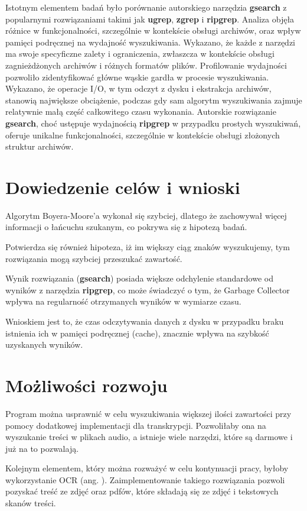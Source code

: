 Istotnym elementem badań było porównanie autorskiego narzędzia \textbf{gsearch} z 
popularnymi rozwiązaniami takimi jak \textbf{ugrep}, \textbf{zgrep} i \textbf{ripgrep}. Analiza objęła 
różnice w funkcjonalności, szczególnie w kontekście obsługi archiwów, oraz wpływ
pamięci podręcznej na wydajność wyszukiwania. Wykazano, że każde z narzędzi ma
swoje specyficzne zalety i ograniczenia, zwłaszcza w kontekście obsługi
zagnieżdżonych archiwów i różnych formatów plików. Profilowanie wydajności 
pozwoliło zidentyfikować główne wąskie gardła w procesie wyszukiwania. Wykazano,
że operacje I/O, w tym odczyt z dysku i ekstrakcja archiwów, stanowią największe
obciążenie, podczas gdy sam algorytm wyszukiwania zajmuje relatywnie małą część
całkowitego czasu wykonania. Autorskie rozwiązanie \textbf{gsearch}, choć ustępuje
wydajnością \textbf{ripgrep} w przypadku prostych wyszukiwań, oferuje unikalne 
funkcjonalności, szczególnie w kontekście obsługi złożonych struktur archiwów.

\section{Dowiedzenie celów i wnioski}

Algorytm Boyera-Moore'a wykonał się szybciej, dlatego że zachowywał więcej 
informacji o łańcuchu szukanym, co pokrywa się z hipotezą badań.

Potwierdza się również hipoteza, iż im większy ciąg znaków wyszukujemy, tym
rozwiązania mogą szybciej przeszukać zawartość.

Wynik rozwiązania (\textbf{gsearch}) posiada większe odchylenie standardowe od
wyników z narzędzia \textbf{ripgrep}, co może świadczyć o tym, że Garbage
Collector wpływa na regularność otrzymanych wyników w wymiarze czasu.

Wnioskiem jest to, że czas odczytywania danych z dysku w przypadku braku
istnienia ich w pamięci podręcznej (cache), znacznie wpływa na szybkość 
uzyskanych wyników. 

\section{Możliwości rozwoju}

Program można usprawnić w celu wyszukiwania większej ilości zawartości przy
pomocy dodatkowej implementacji dla transkrypcji. Pozwoliłaby ona na wyszukanie
treści w plikach audio, a istnieje wiele narzędzi, które są darmowe i już
na to pozwalają.

Kolejnym elementem, który można rozważyć w celu kontynuacji pracy, byłoby 
wykorzystanie OCR (ang. ). Zaimplementowanie
takiego rozwiązania pozwoli pozyskać treść ze zdjęć oraz pdfów, które składają 
się ze zdjęć i tekstowych skanów treści.

